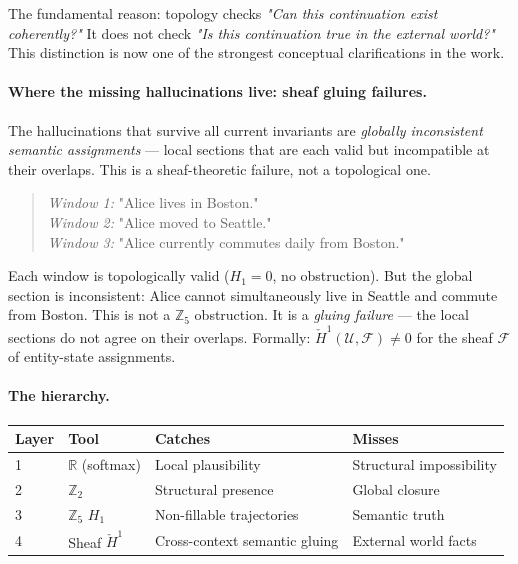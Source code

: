 \documentclass[11pt,a4paper]{article}
\begin{document}
The fundamental reason: topology checks
\emph{"Can this continuation exist coherently?"}
It does not check
\emph{"Is this continuation true in the external world?"}
This distinction is now one of the strongest conceptual
clarifications in the work.

\paragraph{Where the missing hallucinations live: sheaf gluing failures.}

The hallucinations that survive all current invariants are
\emph{globally inconsistent semantic assignments} ---
local sections that are each valid but incompatible at their overlaps.
This is a sheaf-theoretic failure, not a topological one.

\begin{quote}
\emph{Window 1:} "Alice lives in Boston."\\
\emph{Window 2:} "Alice moved to Seattle."\\
\emph{Window 3:} "Alice currently commutes daily from Boston."
\end{quote}

Each window is topologically valid ($H_1 = 0$, no obstruction).
But the global section is inconsistent: Alice cannot simultaneously
live in Seattle and commute from Boston.
This is not a $\mathbb{Z}_5$ obstruction.
It is a \emph{gluing failure} --- the local sections do not agree
on their overlaps.
Formally: $\check{H}^1(\mathcal{U}, \mathcal{F}) \neq 0$
for the sheaf $\mathcal{F}$ of entity-state assignments.

\paragraph{The hierarchy.}

\begin{center}
\renewcommand{\arraystretch}{1.3}\small
\begin{tabularx}{\linewidth}{p{1.5cm}p{2.8cm}p{4.5cm}X}
\toprule
\textbf{Layer} & \textbf{Tool} & \textbf{Catches} & \textbf{Misses} \\
\midrule
1 & $\mathbb{R}$ (softmax) & Local plausibility & Structural impossibility \\
2 & $\mathbb{Z}_2$ & Structural presence & Global closure \\
3 & $\mathbb{Z}_5$ $H_1$ & Non-fillable trajectories & Semantic truth \\
4 & Sheaf $\check{H}^1$ & Cross-context semantic gluing & External world facts \\
\bottomrule
\end{tabularx}
\end{center}
\end{document}
